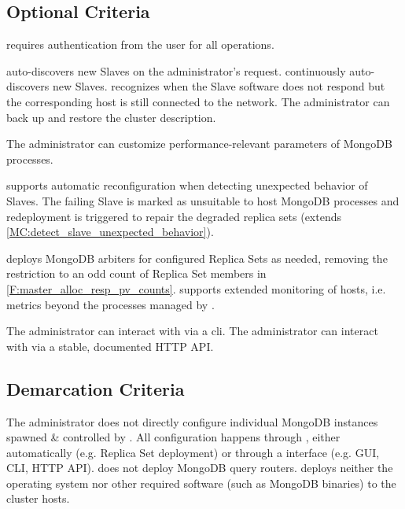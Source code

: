 \subsection{Optional Criteria}\label{OptionalCriteria}
\begin{description}
	
	 \mamid requires authentication from the user for all operations. 
	
	 \mamid auto-discovers new Slaves on the administrator's request. \notdone
	 \mamid continuously auto-discovers new Slaves. \notdone
	 \mamid recognizes when the Slave software does not respond but the corresponding host is still 
	connected to the network.  \notdone
	 The administrator can back up and restore the cluster description. 
	
	 The administrator can customize performance-relevant parameters of MongoDB 
	processes. \notdone
	
	 \mamid supports automatic reconfiguration when detecting unexpected behavior of Slaves. The failing 
	Slave is marked as unsuitable to host MongoDB processes and redeployment is triggered to repair the degraded \glspl{replica 
	set} (extends \ref{MC:detect_slave_unexpected_behavior}). \notdone
	
	 \mamid deploys MongoDB arbiters for configured Replica Sets as needed, removing the 
	restriction to an odd count of Replica Set members in \ref{F:master_alloc_resp_pv_counts}.  \notdone
	 \mamid supports extended monitoring of hosts, i.e. metrics beyond the processes managed by \mamid.  
	\notdone
	
	 The administrator can interact with \mamid via a cli.  \notdone
	 The administrator can interact with \mamid via a stable, documented HTTP API.  \done
\end{description}

\subsection{Demarcation Criteria}
\begin{description}
	 The administrator does not directly configure individual MongoDB instances spawned \& controlled by \mamid. 
	All configuration happens through \mamid, either automatically (e.g. Replica Set deployment) or through a \mamid interface (e.g. 
	GUI, CLI, HTTP API). 
	 \mamid does not deploy MongoDB query routers.  \done
	 \mamid deploys neither the operating system nor other required software (such as MongoDB binaries) to the 
	cluster hosts.  \done
\end{description}
